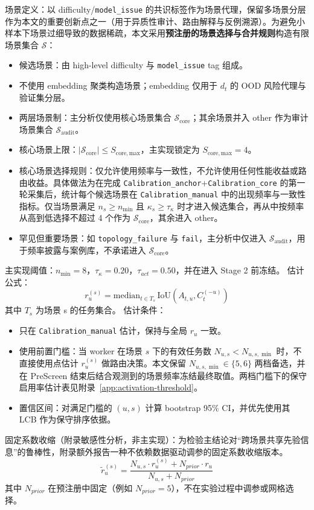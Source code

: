 场景定义：以 difficulty/\texttt{model\_issue} 的共识标签作为场景代理，保留多场景分层作为本文的重要创新点之一（用于异质性审计、路由解释与反例溯源）。为避免小样本下场景过细导致的数据稀疏，本文采用\textbf{预注册的场景选择与合并规则}构造有限场景集合 $\mathcal{S}$：
\begin{itemize}
    \item 候选场景：由 high-level difficulty 与 \texttt{model\_issue} tag 组成。
    \item 不使用 embedding 聚类构造场景；embedding 仅用于 $d_t$ 的 OOD 风险代理与验证集分层。
    \item 两层场景制：主分析仅使用核心场景集合 $\mathcal{S}_{\mathrm{core}}$；其余场景并入 other 作为审计场景集合 $\mathcal{S}_{\mathrm{audit}}$。
    \item 核心场景上限：$\left|\mathcal{S}_{\mathrm{core}}\right|\le S_{\mathrm{core,max}}$，主实现锁定为 $S_{\mathrm{core,max}}=4$。
    \item 核心场景选择规则：仅允许使用频率与一致性，不允许使用任何性能收益或路由收益。具体做法为在完成 \texttt{Calibration\_anchor}+\texttt{Calibration\_core} 的第一轮采集后，统计每个候选场景在 \texttt{Calibration\_manual} 中的出现频率与一致性指标。仅当场景满足 $n_s\ge n_{\min}$ 且 $\kappa_s\ge \tau_\kappa$ 时才进入候选集合，再从中按频率从高到低选择不超过 4 个作为 $\mathcal{S}_{\mathrm{core}}$，其余进入 other。
    \item 罕见但重要场景：如 \texttt{topology\_failure} 与 \texttt{fail}，主分析中仅进入 $\mathcal{S}_{\mathrm{audit}}$，用于频率披露与案例库，不承诺进入 $\mathcal{S}_{\mathrm{core}}$。
\end{itemize}
主实现阈值：$n_{\min}=8$，$\tau_\kappa=0.20$，$\tau_{act}=0.50$，并在进入 Stage 2 前冻结。
估计公式：
\[r_u^{\left(s\right)}=\mathrm{median}_{t\in T_s}\,\mathrm{IoU}\left(A_{t,u},C_t^{\left(-u\right)}\right)\]
其中 $T_s$ 为场景 s 的任务集合。
估计条件：
\begin{itemize}
    \item 只在 \texttt{Calibration\_manual} 估计，保持与全局 $r_u$ 一致。
    \item 使用前置门槛：当 worker 在场景 $s$ 下的有效任务数 $N_{u,s}<N_{u,s,\min}$ 时，不直接使用点估计 $r_u^{(s)}$ 做路由决策。本文保留 $N_{u,s,\min}\in\{5,6\}$ 两档备选，并在 PreScreen 结束后结合观测到的场景频率冻结最终取值。两档门槛下的保守启用率估计表见附录~\ref{app:activation-threshold}。
    \item 置信区间：对满足门槛的 $(u,s)$ 计算 bootstrap 95\% CI，并优先使用其 LCB 作为保守排序依据。
\end{itemize}
\noindent 固定系数收缩（附录敏感性分析，非主实现）：为检验主结论对“跨场景共享先验信息”的鲁棒性，附录额外报告一种不依赖数据驱动调参的固定系数收缩版本。
\[\tilde{r}_u^{\left(s\right)}=\frac{N_{u,s}\cdot r_u^{\left(s\right)}+N_{prior}\cdot r_u}{N_{u,s}+N_{prior}}\]
其中 $N_{prior}$ 在预注册中固定（例如 $N_{prior}=5$），不在实验过程中调参或网格选择。

